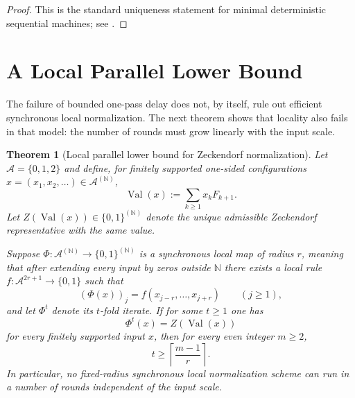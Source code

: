 \documentclass[11pt,letterpaper]{article}
\numberwithin{equation}{section}
\theoremstyle{plain}
\newtheorem{theorem}{Theorem}[section]
\theoremstyle{definition}
\theoremstyle{remark}
\newcommand{\A}{\mathcal{A}}
\newcommand{\NN}{\mathbb{N}}
\DeclareMathOperator{\Val}{Val}
\begin{document}
\begin{proof}
This is the standard uniqueness statement for minimal deterministic sequential
machines; see \cite{BerstelReutenauer1988RationalSeries}.
\end{proof}

\section{A Local Parallel Lower Bound}\label{sec:complexity}

The failure of bounded one-pass delay does not, by itself, rule out efficient
synchronous local normalization.  The next theorem shows that locality also
fails in that model: the number of rounds must grow linearly with the input
scale.

\begin{theorem}[Local parallel lower bound for Zeckendorf normalization]\label{thm:zeckendorf-parallel-propagation-lower-bound}
Let $\A=\{0,1,2\}$ and define, for finitely supported one-sided configurations
$x=(x_1,x_2,\ldots)\in\A^{(\NN)}$,
\[
\Val(x):=\sum_{k\ge 1} x_kF_{k+1}.
\]
Let $Z(\Val(x))\in\{0,1\}^{(\NN)}$ denote the unique admissible Zeckendorf
representative with the same value.

Suppose $\Phi:\A^{(\NN)}\to\{0,1\}^{(\NN)}$ is a synchronous local map of
radius $r$, meaning that after extending every input by zeros outside $\NN$
there exists a local rule $f:\A^{2r+1}\to\{0,1\}$ such that
\[
(\Phi(x))_j=f(x_{j-r},\dots,x_{j+r})
\qquad (j\ge 1),
\]
and let $\Phi^t$ denote its $t$-fold iterate.  If for some $t\ge 1$ one has
\[
\Phi^t(x)=Z(\Val(x))
\]
for every finitely supported input $x$, then for every even integer $m\ge 2$,
\[
t\ge \left\lceil \frac{m-1}{r}\right\rceil.
\]
In particular, no fixed-radius synchronous local normalization scheme can run
in a number of rounds independent of the input scale.
\end{theorem}
\end{document}
